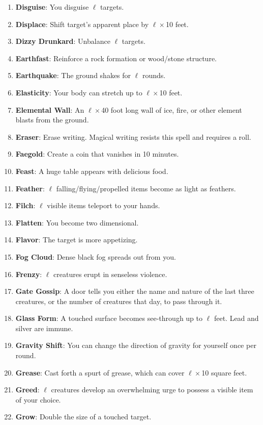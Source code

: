 \documentclass[twoside]{article}
\begin{document}
\begin{enumerate}[nosep]
\item \textbf{Disguise}: You disguise $\ell$ targets.
\item \textbf{Displace}: Shift target's apparent place by $\ell\times$10 feet.
\item \textbf{Dizzy Drunkard}: Unbalance $\ell$ targets.
\item \textbf{Earthfast}: Reinforce a rock formation or wood/stone structure.
\item \textbf{Earthquake}: The ground shakes for $\ell$ rounds.
\item \textbf{Elasticity}: Your body can stretch up to $\ell\times$10 feet.
\item \textbf{Elemental Wall}: An $\ell\times$40 foot long wall of ice, fire, or other element blasts from the ground.
\item \textbf{Eraser}: Erase writing. Magical writing resists this spell and requires a roll.
\item \textbf{Faegold}: Create a coin that vanishes in 10 minutes.
\item \textbf{Feast}: A huge table appears with delicious food.
\item \textbf{Feather}: $\ell$ falling/flying/propelled items become as light as feathers.
\item \textbf{Filch}: $\ell$ visible items teleport to your hands.
\item \textbf{Flatten}: You become two dimensional.
\item \textbf{Flavor}: The target is more appetizing.
\item \textbf{Fog Cloud}: Dense black fog spreads out from you.
\item \textbf{Frenzy}: $\ell$ creatures erupt in senseless violence.
\item \textbf{Gate Gossip}: A door tells you either the name and nature of the last three creatures, or the number of creatures that day, to pass through it.
\item \textbf{Glass Form}: A touched surface becomes see-through up to $\ell$ feet. Lead and silver are immune.
\item \textbf{Gravity Shift}: You can change the direction of gravity for yourself once per round.
\item \textbf{Grease}: Cast forth a spurt of grease, which can cover $\ell\times$10 square feet.
\item \textbf{Greed}: $\ell$ creatures develop an overwhelming urge to possess a visible item of your choice.
\item \textbf{Grow}: Double the size of a touched target.

\end{enumerate}
\end{document}
